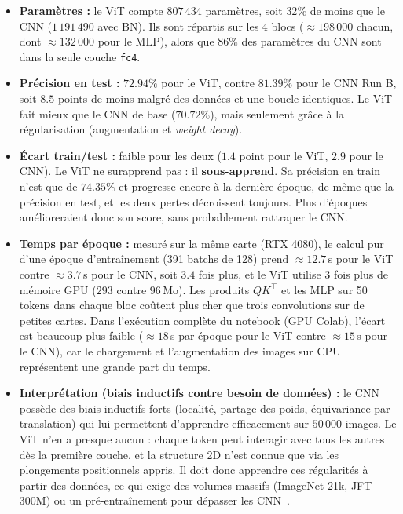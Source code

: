 \documentclass{report}
\begin{document}
\begin{itemize}
    \item \textbf{Paramètres :} le ViT compte $807\,434$ paramètres, soit $32\%$ de moins que le CNN ($1\,191\,490$ avec BN). Ils sont répartis sur les 4 blocs ($\approx 198\,000$ chacun, dont $\approx 132\,000$ pour le MLP), alors que $86\%$ des paramètres du CNN sont dans la seule couche \texttt{fc4}.
    \item \textbf{Précision en test :} $72.94\%$ pour le ViT, contre $81.39\%$ pour le CNN Run B, soit $8.5$ points de moins malgré des données et une boucle identiques. Le ViT fait mieux que le CNN de base ($70.72\%$), mais seulement grâce à la régularisation (augmentation et \textit{weight decay}).
    \item \textbf{Écart train/test :} faible pour les deux ($1.4$ point pour le ViT, $2.9$ pour le CNN). Le ViT ne surapprend pas : il \textbf{sous-apprend}. Sa précision en train n'est que de $74.35\%$ et progresse encore à la dernière époque, de même que la précision en test, et les deux pertes décroissent toujours. Plus d'époques amélioreraient donc son score, sans probablement rattraper le CNN.
    \item \textbf{Temps par époque :} mesuré sur la même carte (RTX 4080), le calcul pur d'une époque d'entraînement (391 batchs de 128) prend $\approx 12.7$\,s pour le ViT contre $\approx 3.7$\,s pour le CNN, soit $3.4$ fois plus, et le ViT utilise $3$ fois plus de mémoire GPU ($293$ contre $96$\,Mo). Les produits $QK^\top$ et les MLP sur 50 tokens dans chaque bloc coûtent plus cher que trois convolutions sur de petites cartes. Dans l'exécution complète du notebook (GPU Colab), l'écart est beaucoup plus faible ($\approx 18$\,s par époque pour le ViT contre $\approx 15$\,s pour le CNN), car le chargement et l'augmentation des images sur CPU représentent une grande part du temps.
    \item \textbf{Interprétation (biais inductifs contre besoin de données) :} le CNN possède des biais inductifs forts (localité, partage des poids, équivariance par translation) qui lui permettent d'apprendre efficacement sur $50\,000$ images. Le ViT n'en a presque aucun : chaque token peut interagir avec tous les autres dès la première couche, et la structure 2D n'est connue que via les plongements positionnels appris. Il doit donc apprendre ces régularités à partir des données, ce qui exige des volumes massifs (ImageNet-21k, JFT-300M) ou un pré-entraînement pour dépasser les CNN~\cite{dosovitskiy2021}.
\end{itemize}
\end{document}
